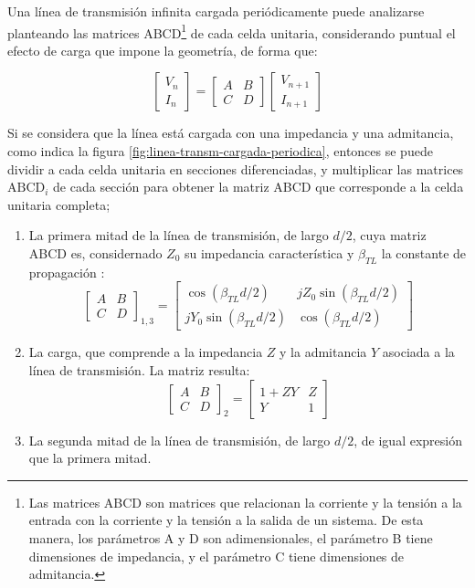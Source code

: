Una línea de transmisión infinita cargada periódicamente puede analizarse planteando las matrices ABCD\footnote{Las matrices ABCD son matrices que relacionan la corriente y la tensión a la entrada con la corriente y la tensión a la salida de un sistema. De esta manera, los parámetros A y D son adimensionales, el parámetro B tiene dimensiones de impedancia, y el parámetro C tiene dimensiones de admitancia.} de cada celda unitaria, considerando puntual el efecto de carga que impone la geometría, de forma que:

\begin{equation}
	\begin{bmatrix}
		V_n \\
		I_n
	\end{bmatrix}
	=
	\begin{bmatrix}
		A & B \\
		C & D
	\end{bmatrix}
	\begin{bmatrix}
		V_{n+1} \\
		I_{n+1}
	\end{bmatrix}
\end{equation}

Si se considera que la línea está cargada con una impedancia y una admitancia, como indica la figura \ref{fig:linea-transm-cargada-periodica}, entonces se puede dividir a cada celda unitaria en secciones diferenciadas, y multiplicar las matrices $\text{ABCD}_{i}$ de cada sección para obtener la matriz ABCD que corresponde a la celda unitaria completa;

\begin{enumerate}
	\item La primera mitad de la línea de transmisión, de largo $d/2$, cuya matriz ABCD es, considernado $Z_0$ su impedancia característica y $\beta_{TL}$ la constante de propagación \cite{Pozar:MwEngineering}:
	\begin{equation}
		\begin{bmatrix}
			A & B \\
			C & D
		\end{bmatrix}_{1,3}
		=
		\begin{bmatrix}
			\cos(\beta_{TL} d/2) & j Z_0 \sin(\beta_{TL} d/2) \\
			j Y_0 \sin(\beta_{TL} d/2) & \cos(\beta_{TL} d/2)
		\end{bmatrix}
	\end{equation}
	\item La carga, que comprende a la impedancia $Z$ y la admitancia $Y$ asociada a la línea de transmisión. La matriz resulta:
	\begin{equation}
		\begin{bmatrix}
			A & B \\
			C & D
		\end{bmatrix}_{2}
		=
		\begin{bmatrix}
			1+ZY & Z \\
			Y & 1
		\end{bmatrix}
	\end{equation}
	\item La segunda mitad de la línea de transmisión, de largo $d/2$, de igual expresión que la primera mitad.
\end{enumerate}


